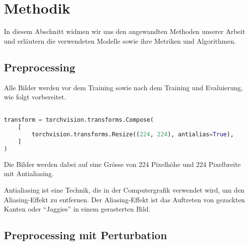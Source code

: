 \section{Methodik}

In diesem Abschnitt widmen wir uns den angewandten Methoden unserer Arbeit und erläutern die verwendeten Modelle sowie ihre Metriken und Algorithmen.

\subsection{Preprocessing}

Alle Bilder werden vor dem Training sowie nach dem Training und Evaluierung, wie folgt vorbereitet. \\

\begin{mdframed}
\begin{lstlisting}[language=python, label={ImagePreprocessor}, caption={Image Preprocessing}]

transform = torchvision.transforms.Compose(
    [
        torchvision.transforms.Resize((224, 224), antialias=True),
    ]
)

\end{lstlisting}
\label{code:preprocessing der Bilder}
\end{mdframed}

Die Bilder werden dabei auf eine Grösse von 224 Pixelhöhe und 224 Pixelbreite mit Antialiasing. 

Antialiasing ist eine Technik, die in der Computergrafik verwendet wird, um den Aliasing-Effekt zu entfernen. Der Aliasing-Effekt ist das Auftreten von gezackten Kanten oder "`Jaggies"' in einem gerasterten Bild.

\subsection{Preprocessing mit Perturbation}
